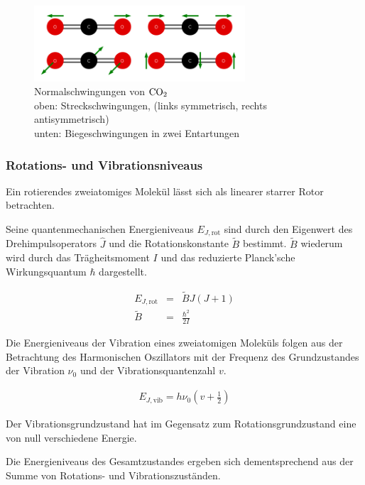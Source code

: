 \documentclass[12pt,a4paper]{scrartcl}
\numberwithin{equation}{section} %
\begin{document}
	\begin{figure}[h!]
		\centering
		\includegraphics[width=0.7\textwidth]{../media/B1.1/Normalschwingung_CO2.png}
		\caption{Normalschwingungen von $\ce{CO_2}$ \cite{abb:Schwingungen CO2}\\
			oben: Streckschwingungen, (links symmetrisch, rechts antisymmetrisch)\\
			unten: Biegeschwingungen in zwei Entartungen}
		\label{abb:Normalschwingungen CO2}
	\end{figure}
	
	\subsubsection{Rotations- und Vibrationsniveaus}
	Ein rotierendes zweiatomiges Molekül lässt sich als linearer starrer Rotor betrachten.
	
	Seine quantenmechanischen Energieniveaus $E_{J, \mathrm{rot}}$ sind durch den Eigenwert des Drehimpulsoperators $\hat J$ und die Rotationskonstante $\tilde{B}$ bestimmt. $\tilde{B}$  wiederum wird durch das Trägheitsmoment $I$ und das reduzierte Planck'sche Wirkungsquantum $\hbar$ dargestellt.
	
	\begin{eqnarray}
		E_{J, \mathrm{rot}} &=& \tilde{B} J (J + 1) \\
		\tilde{B} &=& \frac{\hbar^2}{2 I}
	\end{eqnarray}
	
	\noindent
	Die Energieniveaus der Vibration eines zweiatomigen Moleküls folgen aus der Betrachtung des Harmonischen Oszillators mit der Frequenz des Grundzustandes der Vibration $\nu_0$ und der Vibrationsquantenzahl $v$.
	
	\begin{eqnarray}
		E_{J, \mathrm{vib}} = h \nu_0\left(v + \frac{1}{2}\right)
	\end{eqnarray}
	
	\noindent
	Der Vibrationsgrundzustand hat im Gegensatz zum Rotationsgrundzustand eine von null verschiedene Energie.
	
	Die Energieniveaus des Gesamtzustandes ergeben sich dementsprechend aus der Summe von Rotations- und Vibrationszuständen.
	
\end{document}
